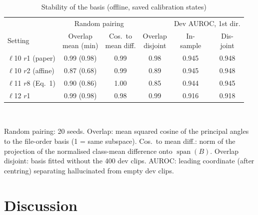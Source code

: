 \documentclass[conference,a4paper]{IEEEtran}
\begin{document}
\begin{table}[!t]
\centering
\caption{Stability of the basis (offline, saved calibration states)}
\label{tab:robust}
\setlength{\tabcolsep}{3pt}
\begin{tabular}{@{}lccccc@{}}
\toprule
& \multicolumn{2}{c}{Random pairing} & & \multicolumn{2}{c}{Dev AUROC, 1st dir.} \\
\cmidrule(lr){2-3}\cmidrule(l){5-6}
Setting & \makecell{Overlap\\mean (min)} & \makecell{Cos.\ to\\mean diff.} & \makecell{Overlap\\disjoint} & \makecell{In-\\sample} & \makecell{Dis-\\joint} \\
\midrule
$\ell$10 $r$1 (paper) & 0.99 (0.98) & 0.99 & 0.98 & 0.945 & 0.948 \\
$\ell$10 $r$2 (affine) & 0.87 (0.68) & 0.99 & 0.89 & 0.945 & 0.948 \\
$\ell$11 $r$8 (Eq.~1) & 0.90 (0.86) & 1.00 & 0.85 & 0.944 & 0.945 \\
$\ell$12 $r$1 & 0.99 (0.98) & 0.98 & 0.99 & 0.916 & 0.918 \\
\bottomrule
\end{tabular}\\[3pt]
\parbox{0.95\columnwidth}{\footnotesize Random pairing: 20 seeds. Overlap: mean squared cosine of the principal angles to the file-order basis (1 = same subspace). Cos.\ to mean diff.: norm of the projection of the normalised class-mean difference onto $\operatorname{span}(B)$. Overlap disjoint: basis fitted without the 400 dev clips. AUROC: leading coordinate (after centring) separating hallucinated from empty dev clips.}
\end{table}

\section{Discussion}
\label{sec:discussion}
\end{document}
